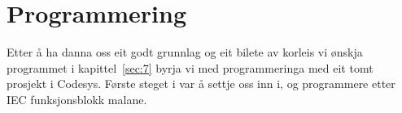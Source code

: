 \chapter{Programmering}
\thispagestyle{fancy}
Etter å ha danna oss eit godt grunnlag og eit bilete av korleis vi ønskja programmet i kapittel~\ref{sec:7} 
byrja vi med programmeringa med eit tomt prosjekt i \gls{Codesys}. Første steget i var å 
settje oss inn i, og programmere etter \gls{IEC} funksjonsblokk malane.


